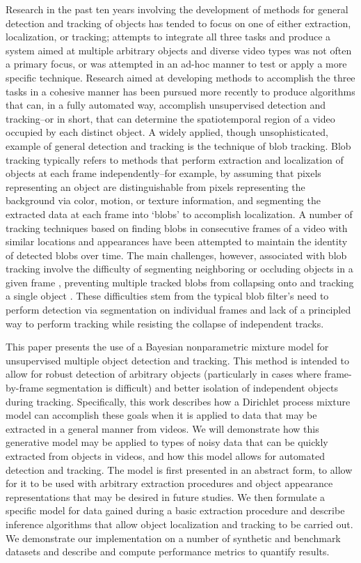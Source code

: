 \documentclass[smallcondensed, final]{svjour3}
\begin{document}
Research in the past ten years involving the development of methods for general detection and tracking of objects has tended to focus on one of either extraction, localization, or tracking; attempts to integrate all three tasks and produce a system aimed at multiple arbitrary objects and diverse video types was not often a primary focus, or was attempted in an ad-hoc manner to test or apply a more specific technique. Research aimed at developing methods to accomplish the three tasks in a cohesive manner has been pursued more recently to produce algorithms that can, in a fully automated way, accomplish unsupervised detection and tracking--or in short, that can determine the spatiotemporal region of a video occupied by each distinct object. A widely applied, though unsophisticated, example of general detection and tracking is the technique of blob tracking. Blob tracking typically refers to methods that perform extraction and localization of objects at each frame independently--for example, by assuming that pixels representing an object are distinguishable from pixels representing the background via color, motion, or texture information, and segmenting the extracted data at each frame into `blobs' to accomplish localization. A number of tracking techniques based on finding blobs in consecutive frames of a video with similar locations and appearances have been attempted to maintain the identity of detected blobs over time. The main challenges, however, associated with blob tracking involve the difficulty of segmenting neighboring or occluding objects in a given frame \cite{zhao2004tracking}, preventing multiple tracked blobs from collapsing onto and tracking a single object \cite{vermaak_2003}. These difficulties stem from the typical blob filter's need to perform detection via segmentation on individual frames and lack of a principled way to perform tracking while resisting the collapse of independent tracks.

This paper presents the use of a Bayesian nonparametric mixture model for unsupervised multiple object detection and tracking. This method is intended to allow for robust detection of arbitrary objects (particularly in cases where frame-by-frame segmentation is difficult) and better isolation of independent objects during tracking. Specifically, this work describes how a Dirichlet process mixture model can accomplish these goals when it is applied to data that may be extracted in a general manner from videos. We will demonstrate how this generative model may be applied to types of noisy data that can be quickly extracted from objects in videos, and how this model allows for automated detection and tracking. The model is first presented in an abstract form, to allow for it to be used with arbitrary extraction procedures and object appearance representations that may be desired in future studies. We then formulate a specific model for data gained during a basic extraction procedure and describe inference algorithms that allow object localization and tracking to be carried out. We demonstrate our implementation on a number of synthetic and benchmark datasets and describe and compute performance metrics to quantify results. 
\end{document}
